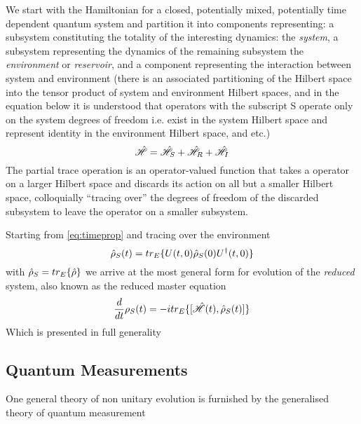 We start with the Hamiltonian for a closed, potentially mixed, potentially time dependent quantum system and partition it into components representing: a subsystem constituting the totality of the interesting dynamics: the \emph{system}, a subsystem representing the dynamics of the remaining subsystem the \emph{environment} or \emph{reservoir}, and a component representing the interaction between system and environment (there is an associated partitioning of the Hilbert space into the tensor product of system and environment Hilbert spaces, and in the equation below it is understood that operators with the subscript S operate only on the system degrees of freedom i.e. exist in the system Hilbert space and represent identity in the environment Hilbert space, and etc.)
\begin{equation}
	\hat{\mathscr{H}} = \hat{\mathscr{H}}_S +\hat{\mathscr{H}}_R + \hat{\mathscr{H}}_I
\end{equation}
The partial trace operation is an operator-valued function that takes a operator on a larger Hilbert space and discards its action on all but a smaller Hilbert space, colloquially ``tracing over'' the degrees of freedom of the discarded subsystem to leave the operator on a smaller subsystem.

Starting from \ref{eq:timeprop} and tracing over the environment
\begin{equation}
	\hat{\rho}_S (t) = tr_E \{U(t, 0) \hat{\rho}_S (0) U^\dagger (t, 0) \}
\end{equation}
with $\hat{\rho}_S = tr_E\{\hat{\rho} \}$ we arrive at the most general form for evolution of the \emph{reduced} system, also known as the reduced master equation
\begin{equation}
	\frac{d}{dt} \rho_S (t) = -itr_E\{[\hat{\mathscr{H}}(t), \hat{\rho}_S(t)]\}
\end{equation}
Which is presented in full generality
\subsection{Quantum Measurements}
One general theory of non unitary evolution is furnished by the generalised theory of quantum measurement \cite{Wiseman2010a}
